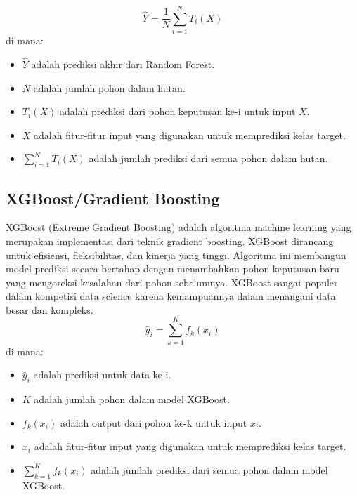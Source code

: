 \begin{equation}
    \hat{Y} = \frac{1}{N} \sum_{i=1}^{N} T_i(X)
\end{equation}
di mana:
\begin{itemize}
    \item \( \hat{Y} \) adalah prediksi akhir dari Random Forest.
    \item \( N \) adalah jumlah pohon dalam hutan.
    \item \( T_i(X) \) adalah prediksi dari pohon keputusan ke-i untuk input \( X \).
    \item \( X \) adalah fitur-fitur input yang digunakan untuk memprediksi kelas target.
    \item \( \sum_{i=1}^{N} T_i(X) \) adalah jumlah prediksi dari semua pohon dalam hutan.
\end{itemize}

\subsection{XGBoost/Gradient Boosting}
XGBoost (Extreme Gradient Boosting) adalah algoritma machine learning yang merupakan implementasi dari teknik gradient boosting. XGBoost dirancang untuk efisiensi, fleksibilitas, dan kinerja yang tinggi. Algoritma ini membangun model prediksi secara bertahap dengan menambahkan pohon keputusan baru yang mengoreksi kesalahan dari pohon sebelumnya. XGBoost sangat populer dalam kompetisi data science karena kemampuannya dalam menangani data besar dan kompleks.
\begin{equation}
    \hat{y}_i = \sum_{k=1}^{K} f_k(x_i)
\end{equation}
di mana:
\begin{itemize}
    \item \( \hat{y}_i \) adalah prediksi untuk data ke-i.
    \item \( K \) adalah jumlah pohon dalam model XGBoost.
    \item \( f_k(x_i) \) adalah output dari pohon ke-k untuk input \( x_i \).
    \item \( x_i \) adalah fitur-fitur input yang digunakan untuk memprediksi kelas target.
    \item \( \sum_{k=1}^{K} f_k(x_i) \) adalah jumlah prediksi dari semua pohon dalam model XGBoost.
\end{itemize}

